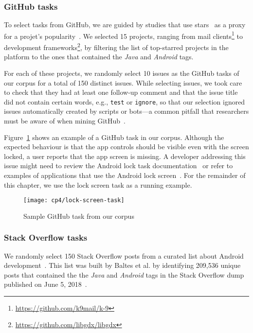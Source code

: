 \subsubsection{GitHub tasks}

To select tasks from GitHub, we are guided by studies that use 
stars~\cite{borges2016, borges2018}
as a proxy for a projet's popularity~\cite{Ferreira2016, Xavier2020}.
We selected 15 projects,
ranging from mail clients\footnote{\url{https://github.com/k9mail/k-9}}
to development frameworks\footnote{\url{https://github.com/libgdx/libgdx}},
by filtering the list of top-starred projects in the platform to the ones that contained the \textit{Java} and \textit{Android} tags.





For each of these projects, we randomly select 10 issues as the GitHub tasks of our corpus for a total of 150 distinct issues.
While selecting issues, we took care to check that they had at least one follow-up comment and that the issue title did not contain certain words, e.g., {\small \texttt{test}} or {\small  \texttt{ignore}},
so that our selection ignored issues automatically created by scripts or bots---a common pitfall that researchers must be aware of when mining GitHub~\cite{kalliamvakou2014}.


Figure~\ref{fig:lock-screen-task} shows an example of a GitHub task in our corpus.
Although the expected behaviour is that the app controls should be visible even with the screen locked,  a user reports that the app screen is missing.
A developer addressing this issue might need to review the Android lock task documentation~\cite{apiLockTask}
or refer to examples of applications that use the Android lock screen~\cite{mediumLockApp}.
For the remainder of this chapter, we use the lock screen task as a running example.


\begin{figure}
    \centering
    \texttt{[image: cp4/lock-screen-task]}
    \caption{Sample GitHub task from our corpus}
    \label{fig:lock-screen-task}
\end{figure}



\subsubsection{Stack Overflow tasks}

We randomly select 150 Stack Overflow posts from a curated list about Android development~\cite{baltes2020}.
This list was built by Baltes et al. 
by identifying 209,536 unique posts that contained the the \textit{Java} and \textit{Android} tags in the Stack Overflow dump published on June 5, 2018~\cite{baltes2019-rep, SOTorrent2019}.


